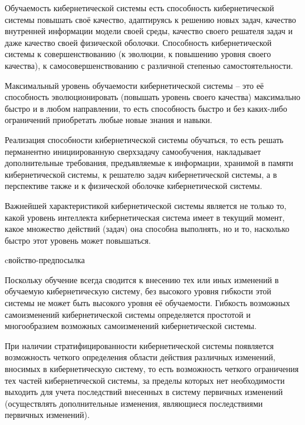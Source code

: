 Обучаемость кибернетической системы есть способность кибернетической системы повышать своё качество, адаптируясь к решению новых задач, качество внутренней информации модели своей среды, качество своего решателя задач и даже качество своей физической оболочки. 
Способность кибернетической системы к совершенствованию (к эволюции, к повышению уровня своего качества), к самосовершенствованию с различной степенью самостоятельности.

Максимальный уровень обучаемости кибернетической системы – это её способность эволюционировать (повышать уровень своего качества) максимально быстро и в любом направлении, то есть способность быстро и без каких-либо ограничений приобретать любые новые знания и навыки.

Реализация способности кибернетической системы обучаться, то есть решать перманентно инициированную сверхзадачу самообучения, накладывает дополнительные требования, предъявляемые к информации, хранимой в памяти кибернетической системы, к решателю задач кибернетической системы, а в перспективе также и к физической оболочке кибернетической системы.

Важнейшей характеристикой кибернетической системы является не только то, какой уровень интеллекта кибернетическая система имеет в текущий момент, какое множество действий (задач) она способна выполнять, но и то, насколько быстро этот уровень может повышаться.

\begin{SCn}
\begin{scnrelfromlist}{cвойство-предпосылка}
\end{scnrelfromlist}
\end{SCn}

Поскольку обучение всегда сводится к внесению тех или иных изменений в обучаемую кибернетическую систему, без высокого уровня гибкости этой системы не может быть высокого уровня её обучаемости.
Гибкость возможных самоизменений кибернетической системы определяется простотой и многообразием возможных самоизменений кибернетической системы.

При наличии стратифицированности кибернетической системы появляется возможность четкого определения области действия различных изменений, вносимых в кибернетическую систему, то есть возможность четкого ограничения тех частей кибернетической системы, за пределы которых нет необходимости выходить для учета последствий внесенных в систему первичных изменений (осуществлять дополнительные изменения, являющиеся последствиями первичных изменений).

